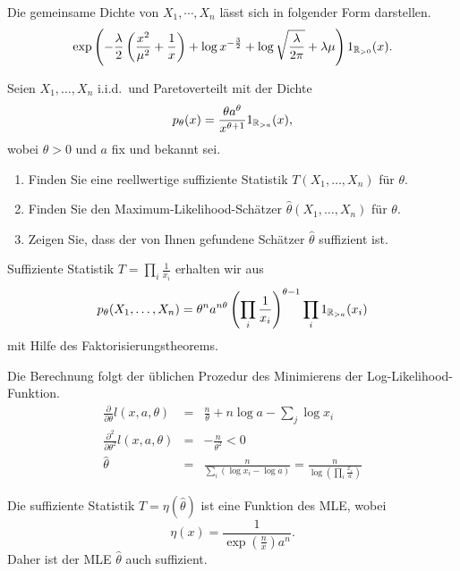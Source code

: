 \solution Die gemeinsame Dichte von $X_1, \cdots, X_n$ 
lässt sich in folgender Form darstellen.
\begin{equation*}
    \exp\left(  -\frac{\lambda}{2}\left( \frac{x^2}{\mu^2} + \frac{1}{x} \right)    
    + \log x^{-\frac{3}{2}} + \log \sqrt{\frac{\lambda}{2\pi}} + 
    \lambda\mu  \right)1_{\mathbb R_{>0}}(x).
\end{equation*}



 Seien $X_1,\ldots,X_n$ i.i.d.\ und
Paretoverteilt mit der Dichte
\begin{equation*}
    p_\theta(x)= \frac{\theta a^\theta}{x^{\theta+1}}1_{\mathbb R_{>a}}(x),
\end{equation*}
wobei $\theta>0$ und $a$ fix und bekannt sei.
\begin{enumerate}
    \item Finden Sie eine reellwertige suffiziente Statistik $T(X_1,\ldots,X_n)$ für $\theta$.
    \item Finden Sie den Maximum-Likelihood-Schätzer $\hat \theta(X_1,\ldots,X_n)$ für $\theta$.
    \item Zeigen Sie, dass der von Ihnen gefundene Schätzer $\hat \theta$ suffizient ist.
\end{enumerate}

\solution
Suffiziente Statistik $T= \prod_i \frac{1}{x_i}$ erhalten wir aus 
\begin{equation}
    p_\theta(X_1,\ldots,X_n) = 
    \theta^n a^{n\theta} \left( \prod_i \frac{1}{x_i} \right)^{\theta-1} \prod_i 1_{\mathbb R_{>a}}(x_i)
\end{equation}
mit Hilfe des Faktorisierungstheorems.

Die Berechnung folgt der üblichen Prozedur des Minimierens der Log-Likelihood-Funktion.
\begin{eqnarray}
    \frac{\partial}{\partial \theta} l(x,a,\theta) &=& 
    \frac{n}{\theta} + n \log a -\sum_{j}^{} \log x_i \\
    \frac{\partial^2}{\partial \theta^2} l(x,a,\theta) &=& - \frac{n}{\theta^2} < 0 \\
    \hat\theta &=& \frac{n}{ \sum_{i}^{} \left( \log x_i - \log a \right)} 
    = \frac{n}{ \log \left( \prod_i \frac{x_i}{a}  \right) }
\end{eqnarray}

Die suffiziente Statistik $T=\eta (\hat\theta)$ ist eine Funktion des MLE, wobei 
\begin{equation}
    \eta(x) = \frac{1}{ \exp\left( \frac{n}{x} \right) a^n}.
\end{equation}
Daher ist der MLE $\hat\theta$ auch suffizient.



